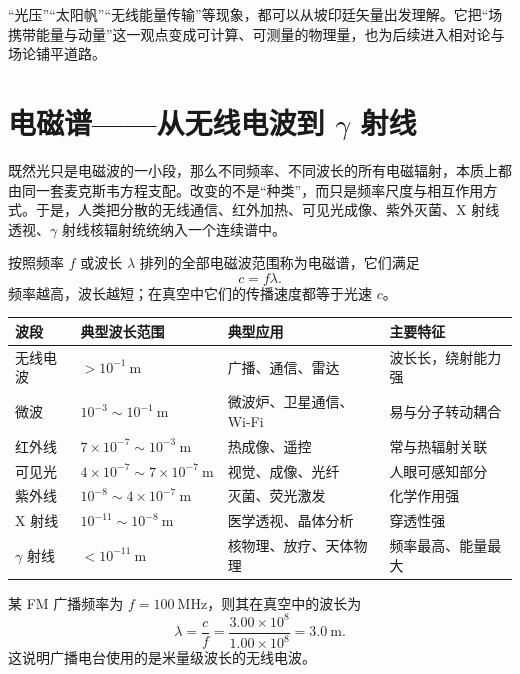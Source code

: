 \begin{remark}
“光压”“太阳帆”“无线能量传输”等现象，都可以从坡印廷矢量出发理解。它把“场携带能量与动量”这一观点变成可计算、可测量的物理量，也为后续进入相对论与场论铺平道路。
\end{remark}

\section{电磁谱——从无线电波到 $\gamma$ 射线}

既然光只是电磁波的一小段，那么不同频率、不同波长的所有电磁辐射，本质上都由同一套麦克斯韦方程支配。改变的不是“种类”，而只是频率尺度与相互作用方式。于是，人类把分散的无线通信、红外加热、可见光成像、紫外灭菌、X 射线透视、$\gamma$ 射线核辐射统统纳入一个连续谱中。

\begin{definition}[电磁谱]
按照频率 $f$ 或波长 $\lambda$ 排列的全部电磁波范围称为电磁谱，它们满足
\[
 c=f\lambda.
\]
频率越高，波长越短；在真空中它们的传播速度都等于光速 $c$。
\end{definition}

\begin{center}
\renewcommand{\arraystretch}{1.25}
\begin{tabular}{p{3cm}p{3.7cm}p{4.8cm}p{3.2cm}}
\toprule
波段 & 典型波长范围 & 典型应用 & 主要特征 \\
\midrule
无线电波 & $>10^{-1}\ \text{m}$ & 广播、通信、雷达 & 波长长，绕射能力强 \\
微波 & $10^{-3}\sim10^{-1}\ \text{m}$ & 微波炉、卫星通信、Wi-Fi & 易与分子转动耦合 \\
红外线 & $7\times10^{-7}\sim10^{-3}\ \text{m}$ & 热成像、遥控 & 常与热辐射关联 \\
可见光 & $4\times10^{-7}\sim7\times10^{-7}\ \text{m}$ & 视觉、成像、光纤 & 人眼可感知部分 \\
紫外线 & $10^{-8}\sim4\times10^{-7}\ \text{m}$ & 灭菌、荧光激发 & 化学作用强 \\
X 射线 & $10^{-11}\sim10^{-8}\ \text{m}$ & 医学透视、晶体分析 & 穿透性强 \\
$\gamma$ 射线 & $<10^{-11}\ \text{m}$ & 核物理、放疗、天体物理 & 频率最高、能量最大 \\
\bottomrule
\end{tabular}
\end{center}

\begin{example}[由频率求波长]
某 FM 广播频率为 $f=100\ \text{MHz}$，则其在真空中的波长为
\[
\lambda=\frac{c}{f}=\frac{3.00\times 10^8}{1.00\times10^8}=3.0\ \text{m}.
\]
这说明广播电台使用的是米量级波长的无线电波。
\end{example}

